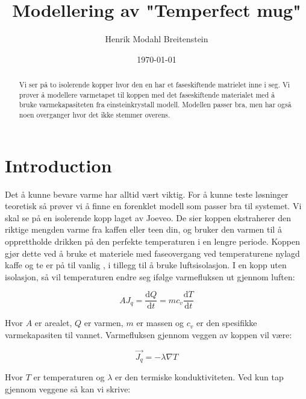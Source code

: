 \documentclass[ reprint, amsmath,amssymb, aps]{revtex4-2}
\begin{document}
\title{Modellering av "Temperfect mug"}


\author{Henrik Modahl Breitenstein}



\date{\today}

\begin{abstract}
Vi ser på to isolerende kopper hvor den en har et faseskiftende matrielet inne i seg. Vi prøver å modellere varmetapet til koppen med det faseskiftende materialet med å bruke varmekapasiteten fra einsteinkrystall modell. Modellen passer bra, men har også noen overganger hvor det ikke stemmer overens.
\end{abstract}

\maketitle


\section{Introduction}
Det å kunne bevare varme har alltid vært viktig. For å kunne teste løsninger teoretisk så prøver vi å finne en forenklet modell som passer bra til systemet. Vi skal se på en isolerende kopp laget av Joeveo. De sier koppen ekstraherer den riktige mengden varme fra kaffen eller teen din, og bruker den varmen til å opprettholde drikken på den perfekte temperaturen i en lengre periode. Koppen gjør dette ved å bruke et materiele med faseovergang ved temperaturene nylagd kaffe og te er på til vanlig , i tillegg til å bruke luftsisolasjon. I en kopp uten isolasjon, så vil temperaturen endre seg ifølge varmefluksen ut gjennom luften:

\begin{equation}
\label{heatflux}
AJ_q = \frac{\mathrm{d}Q}{\mathrm{d}t} = mc_v\frac{\mathrm{d}T}{\mathrm{d}t}
\end{equation}  

Hvor $A$ er arealet, $Q$ er varmen, $m$ er massen og $c_v$ er den spesifikke varmekapasiten til vannet. Varmefluksen gjennom veggen av koppen vil være:

\begin{equation}
\label{veggtap}
\vec{J_q} = - \lambda \nabla{T}
\end{equation}

Hvor $T$ er temperaturen og $\lambda$ er den termiske konduktiviteten. Ved kun tap gjennom veggene så kan vi skrive:
\end{document}
